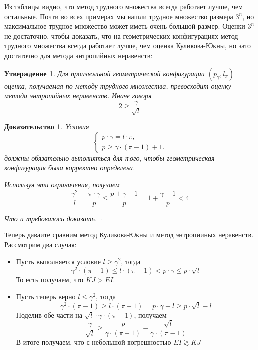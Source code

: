 \documentclass[a4paper]{article}
\newtheorem*{msolution}{Доказательство}
\newtheorem{mclaim}{Утверждение}[section]
\begin{document}
Из таблицы видно, что метод трудного множества всегда работает лучше, чем остальные. 
Почти во всех примерах мы нашли трудное множество размера $3^n$, но максимальное трудное множество 
может иметь очень большой размер. Оценки $3^n$ не достаточно, чтобы доказать, что на геометрических конфигурациях 
метод трудного множества всегда работает лучше, чем оценка Куликова-Юкны, но зато достаточно для 
метода энтропийных неравенств:

\begin{mclaim}
    Для произвольной геометрической конфигурации $(p_{\gamma}, l_{\pi})$ оценка, получаемая по методу 
    трудного множества, превосходит оценку метода энтропийных неравенств. Иначе говоря 
    $$2 \geq \frac{\gamma}{\sqrt{l}}$$
\end{mclaim}

\begin{msolution}
	Условия 
	\begin{equation*}
	    \begin{cases}
			p\cdot \gamma = l\cdot \pi, \\
			p \geq \gamma\cdot (\pi - 1) + 1.
		\end{cases}
	\end{equation*}
	должны обязательно выполняться для того, чтобы геометрическая конфигурация была корректно определена.
	
	Используя эти ограничения, получаем $$\frac{\gamma^2}{l} = \frac{\pi\cdot\gamma}{p} \leq \frac{p + 
	\gamma - 1}{p} = 1 + \frac{\gamma - 1}{p} < 4$$
	
	Что и требовалось доказать. $\square$
\end{msolution}

Теперь давайте сравним метод Куликова-Юкны и метод энтропийных неравенств. Рассмотрим два случая:
\begin{itemize}[noitemsep]
    \item Пусть выполняется условие $l \geq \gamma^2$, тогда $$\gamma^2 \cdot (\pi - 1) \leq l \cdot (\pi - 1) 
    < p\cdot\gamma \leq p\cdot\sqrt{l}$$ То есть получаем, что $KJ > EI$.
    \item Пусть теперь верно $l \leq \gamma^2$, тогда $$\gamma^2\cdot (\pi - 1) \geq l\cdot(\pi - 1) = 
    p\cdot\gamma - l \geq p\cdot\sqrt{l} - l$$ Поделив обе части на $\sqrt{l}\cdot\gamma\cdot(\pi -1)$, 
    получаем $$\frac{\gamma}{\sqrt{l}} \geq \frac{p}{\gamma\cdot(\pi - 1)} - \frac{\sqrt{l}}{\gamma\cdot(\pi-1)}$$
	В итоге получаем, что с небольшой погрешностью $EI \gtrsim KJ$
\end{itemize}
\end{document}
